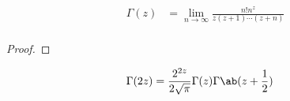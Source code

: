 \documentclass[uplatex,diffipdfmx,a4paper,11pt]{jlreq}
\begin{document}
\begin{proposition}
  \begin{align}
    \Gamma(z) & = \lim_{n\to\infty}\frac{n!n^z}{z(z+1)\cdots(z+n)} \\
  \end{align}
\end{proposition}
\begin{proof}
\end{proof}

\begin{proposition}
  \begin{align}
    \Gamma(2z) & = \frac{2^{2z}}{2\sqrt{\pi}}\Gamma(z)\Gamma\ab(z + \frac{1}{2})
  \end{align}
\end{proposition}
\end{document}
